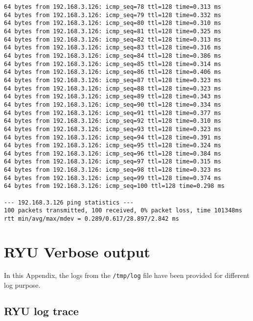 \begin{lstlisting}[frame=single, caption={The Ping test with OVS}, label={lst:Pingtest_with_OVS}]
64 bytes from 192.168.3.126: icmp_seq=78 ttl=128 time=0.313 ms
64 bytes from 192.168.3.126: icmp_seq=79 ttl=128 time=0.332 ms
64 bytes from 192.168.3.126: icmp_seq=80 ttl=128 time=0.310 ms
64 bytes from 192.168.3.126: icmp_seq=81 ttl=128 time=0.325 ms
64 bytes from 192.168.3.126: icmp_seq=82 ttl=128 time=0.313 ms
64 bytes from 192.168.3.126: icmp_seq=83 ttl=128 time=0.316 ms
64 bytes from 192.168.3.126: icmp_seq=84 ttl=128 time=0.386 ms
64 bytes from 192.168.3.126: icmp_seq=85 ttl=128 time=0.314 ms
64 bytes from 192.168.3.126: icmp_seq=86 ttl=128 time=0.406 ms
64 bytes from 192.168.3.126: icmp_seq=87 ttl=128 time=0.323 ms
64 bytes from 192.168.3.126: icmp_seq=88 ttl=128 time=0.323 ms
64 bytes from 192.168.3.126: icmp_seq=89 ttl=128 time=0.343 ms
64 bytes from 192.168.3.126: icmp_seq=90 ttl=128 time=0.334 ms
64 bytes from 192.168.3.126: icmp_seq=91 ttl=128 time=0.377 ms
64 bytes from 192.168.3.126: icmp_seq=92 ttl=128 time=0.310 ms
64 bytes from 192.168.3.126: icmp_seq=93 ttl=128 time=0.323 ms
64 bytes from 192.168.3.126: icmp_seq=94 ttl=128 time=0.391 ms
64 bytes from 192.168.3.126: icmp_seq=95 ttl=128 time=0.324 ms
64 bytes from 192.168.3.126: icmp_seq=96 ttl=128 time=0.384 ms
64 bytes from 192.168.3.126: icmp_seq=97 ttl=128 time=0.315 ms
64 bytes from 192.168.3.126: icmp_seq=98 ttl=128 time=0.323 ms
64 bytes from 192.168.3.126: icmp_seq=99 ttl=128 time=0.374 ms
64 bytes from 192.168.3.126: icmp_seq=100 ttl=128 time=0.298 ms

--- 192.168.3.126 ping statistics ---
100 packets transmitted, 100 received, 0% packet loss, time 101348ms
rtt min/avg/max/mdev = 0.289/0.617/28.897/2.842 ms

\end{lstlisting}
\chapter{RYU Verbose output}\label{app:ch:logs}

In this Appendix, the logs from the \verb|/tmp/log| file have been provided for different log purpose.

\section{RYU log trace}\label{app:sec:RYUlogtrace}

